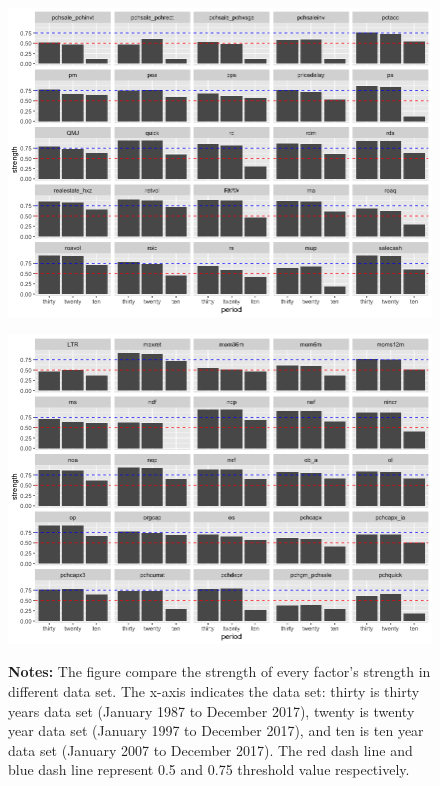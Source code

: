 \begin{landscape}
	\begin{figure}[ht]
		\includegraphics[scale = 0.75]{strength_comparison_V}
		\centering
	\end{figure}
\end{landscape}

\begin{landscape}
	\begin{figure}[ht]
		\includegraphics[scale = 0.75]{strength_comparison_IV}
		\centering
		\begin{minipage}{\textwidth}
			{\footnotesize {\bf Notes:} The figure compare the strength of every factor's strength in different data set. The x-axis indicates the data set: thirty is thirty years data set (January 1987 to December 2017), twenty is twenty year data set (January 1997 to December 2017), and ten is ten year data set (January 2007 to December 2017). The red dash line and blue dash line represent 0.5 and 0.75 threshold value respectively.}
		\end{minipage}
	\end{figure}
\end{landscape}

